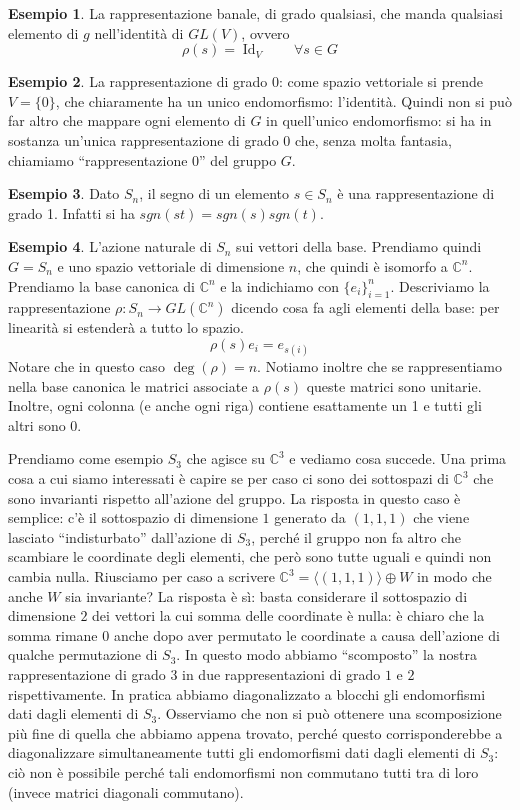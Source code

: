 \documentclass[11pt]{article}
\theoremstyle{plain}
\theoremstyle{definition}
\newtheorem{exmp}{Esempio}[section]
\theoremstyle{remark}
\newcommand{\C}{\mathbb{C}}
\DeclareMathOperator{\Id}{Id}
\begin{document}
\begin{exmp}
   La rappresentazione banale, di grado qualsiasi, che manda qualsiasi elemento di $g$ nell'identità di $GL(V)$, ovvero
	\[ \rho(s ) = \Id_{V} \qquad \forall s \in G\]
\end{exmp}
\begin{exmp}
	La rappresentazione di grado $0$: come spazio vettoriale si prende $V=\{0\}$, che chiaramente ha un unico endomorfismo: l'identità.
	Quindi non si può far altro che mappare ogni elemento di $G$ in quell'unico endomorfismo: si ha in sostanza un'unica rappresentazione di grado
	$0$ che, senza molta fantasia, chiamiamo ``rappresentazione $0$'' del gruppo $G$.
\end{exmp}
\begin{exmp}
   Dato $S_n$, il segno di un elemento $s\in S_n$ è una rappresentazione di grado 1. Infatti si ha $sgn(st) = sgn(s) sgn(t)$.
\end{exmp}
\begin{exmp}
   L'azione naturale di $S_n$ sui vettori della base. Prendiamo quindi $G = S_n$ e uno spazio vettoriale di dimensione $n$, che quindi è isomorfo a $\C^n$. Prendiamo la base canonica di $\C^n$ e la indichiamo con $\{e_i\}_{i=1}^n$. Descriviamo la rappresentazione $\rho: S_n \to GL(\C^n)$ dicendo cosa fa agli elementi della base: per linearità si estenderà a tutto lo spazio.
	\[ \rho(s) e_i = e_{s(i)}\]
	Notare che in questo caso $\deg(\rho) = n$. Notiamo inoltre che se rappresentiamo nella base canonica le matrici associate a $\rho(s)$ queste matrici sono unitarie. Inoltre, ogni colonna (e anche ogni riga) contiene esattamente un 1 e tutti gli altri sono 0.

	Prendiamo come esempio $S_3$ che agisce su $\C^3$ e vediamo cosa succede.
	Una prima cosa a cui siamo interessati è capire se per caso ci sono dei sottospazi di $\C^3$ che sono invarianti rispetto
	all'azione del gruppo. La risposta in questo caso è semplice: c'è il sottospazio di dimensione $1$ generato da $(1,1,1)$ che
	viene lasciato ``indisturbato'' dall'azione di $S_3$, perché il gruppo non fa altro che scambiare le coordinate degli elementi,
	che però sono tutte uguali e quindi non cambia nulla.
	Riusciamo per caso a scrivere $\C^3 = \langle(1,1,1)\rangle \oplus W$ in  modo che anche $W$ sia invariante? La risposta è sì:
	basta considerare il sottospazio di dimensione $2$ dei vettori la cui somma delle coordinate è nulla: è chiaro che la somma rimane $0$ anche
	dopo aver permutato le coordinate a causa dell'azione di qualche permutazione di $S_3$. In questo modo abbiamo
	``scomposto'' la nostra rappresentazione di grado $3$ in due rappresentazioni di grado $1$ e $2$ rispettivamente.
	In pratica abbiamo diagonalizzato a blocchi gli endomorfismi dati dagli elementi di $S_3$.
	Osserviamo che non si può ottenere una scomposizione più fine di quella che abbiamo appena trovato, perché questo corrisponderebbe
	a diagonalizzare simultaneamente tutti gli endomorfismi dati dagli elementi di $S_3$: ciò non è possibile perché tali endomorfismi
	non commutano tutti tra di loro (invece matrici diagonali commutano).
\end{exmp}
\end{document}
